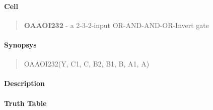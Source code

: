 \label{OAAOI232}
\paragraph{Cell}
\begin{quote}
    \textbf{OAAOI232} - a 2-3-2-input OR-AND-AND-OR-Invert gate
\end{quote}

\paragraph{Synopsys}
\begin{quote}
    OAAOI232(Y, C1, C, B2, B1, B, A1, A)
\end{quote}

\paragraph{Description}

%

\paragraph{Truth Table}
%

